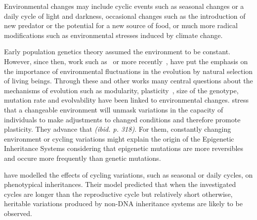 Environmental changes may include cyclic events such as seasonal changes or a daily cycle of light and darkness, occasional changes such as the introduction of new predator or the potential for a new source of food, or much more radical modifications such as environmental stresses induced by climate change.

Early population genetics theory assumed the environment to be constant. However, since then, work such as~\citep{levins1968evolution} or more recently~\citep{jablonka2014evolution}, have put the emphasis on the importance of environmental fluctuations in the evolution by natural selection of living beings. Through these and other works many central questions about the mechanisms of evolution such as modularity, plasticity~\citep{west2005developmental}, size of the genotype, mutation rate and evolvability have been linked to environmental changes. \cite{jablonka2014evolution} stress that a changeable environment will unmask variations in the capacity of individuals to make adjustments to changed conditions and therefore promote plasticity. They advance that \emph{(ibid. p. 318)}. For them, constantly changing environment or cycling variations might explain the origin of the Epigenetic Inheritance Systems  considering that epigenetic mutations are more reversibles and occure more frequently than genetic mutations. 

\cite{lachmann1996inheritance} have modelled the effects of cycling variations, such as seasonal or daily cycles, on phenotypical inheritances. Their model predicted that when the investigated cycles are longer than the reproductive cycle but relatively short otherwise, heritable variations produced by non-DNA inheritance systems are likely to be observed. 

